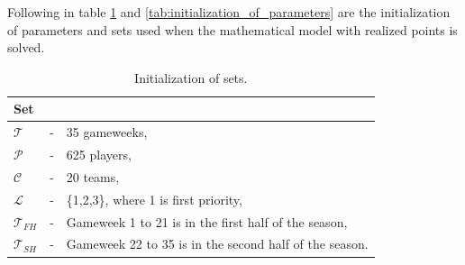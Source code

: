 Following in table \ref{tab:initializations_of_sets} and \ref{tab:initialization_of_parameters} are the initialization of parameters and sets used when the mathematical model with realized points is solved. 

\begin{table}[H]
\centering
\caption{Initialization of sets.}
\begin{tabular}{@{}lll@{}}
\toprule
Set           &   &                                                               \\ \midrule
$\mathcal{T}$ & - & 35 gameweeks,                                             \\
$\mathcal{P}$ & - & 625 players,                                               \\
$\mathcal{C}$ & - & 20 teams,                                                 \\
$\mathcal{L}$ & - & \{1,2,3\}, where 1 is first priority, \\
$\mathcal{T}_{FH}$ & - & Gameweek 1 to 21 is in the first half of the season,\\
$\mathcal{T}_{SH}$ & - & Gameweek 22 to 35 is in the second half of the season.\\
\bottomrule
\end{tabular}
\label{tab:initializations_of_sets}
\end{table}

